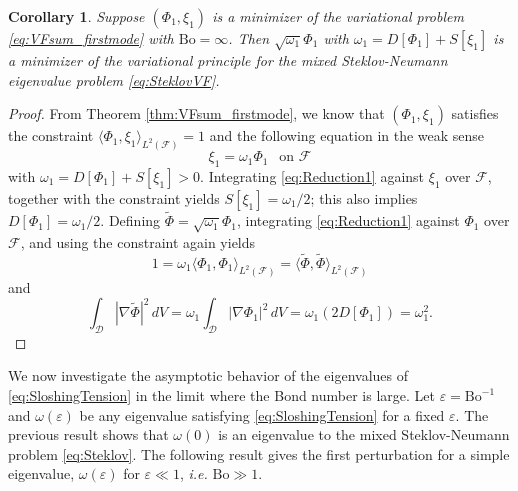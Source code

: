 \documentclass[letterpaper, 12pt]{amsart}
\newtheorem{corollary}[definition]{Corollary}
\newcommand{\bond}{\mathrm{Bo}}
\newcommand{\D}{\mathcal{D}}
\newcommand{\F}{\mathcal{F}}
\begin{document}
\begin{corollary} \label{cor:ZeroSurfaceTension}
Suppose $(\Phi_1,\xi_1)$ is a minimizer of the variational problem \eqref{eq:VFsum_firstmode} with $\bond=\infty$. Then $\sqrt{\omega_1}\Phi_1$ with $\omega_1=D[\Phi_1]+S[\xi_1]$ is a minimizer of the variational principle for the mixed Steklov-Neumann eigenvalue problem  \eqref{eq:SteklovVF}. 
\end{corollary}
\begin{proof}
From Theorem \ref{thm:VFsum_firstmode},  we know that $(\Phi_1,\xi_1)$ satisfies  the constraint $\langle\Phi_1,\xi_1\rangle_{L^2(\F)}=1$ and the following equation in the weak sense
\begin{equation}
\xi_1 = \omega_1\Phi_1 \ \ \textrm{ on }\F \label{eq:Reduction1}
\end{equation}
with $\omega_1=D[\Phi_1]+S[\xi_1]>0$. Integrating \eqref{eq:Reduction1} against $\xi_1$ over $\F$, together with the constraint yields $S[\xi_1]=\omega_1/2$; this also implies $D[\Phi_1]=\omega_1/2$. Defining $\tilde\Phi=\sqrt{\omega_1}\Phi_1$, integrating \eqref{eq:Reduction1} against $\Phi_1$ over $\F$, and using the constraint again yields
\[ 1=\omega_1\langle\Phi_1,\Phi_1\rangle_{L^2(\F)} = \langle\tilde\Phi,\tilde\Phi\rangle_{L^2(\F)} \]
and
\[ \int_\D |\nabla\tilde\Phi|^2\, dV = \omega_1\int_\D|\nabla\Phi_1|^2\, dV = \omega_1(2D[\Phi_1]) = \omega_1^2. \]
\end{proof}


We now investigate the asymptotic behavior of the eigenvalues of \eqref{eq:SloshingTension} in the limit where the Bond number is large. Let $\varepsilon=\bond^{-1}$ and $\omega(\varepsilon)$ be any eigenvalue satisfying \eqref{eq:SloshingTension} for a fixed $\varepsilon$. The previous result shows that $\omega(0)$ is an eigenvalue to the mixed Steklov-Neumann problem \eqref{eq:Steklov}. The following result gives the first perturbation for a simple eigenvalue, $\omega(\varepsilon)$  for $\varepsilon\ll 1$, {\it{i.e.}} $\bond\gg 1$. 
\end{document}
